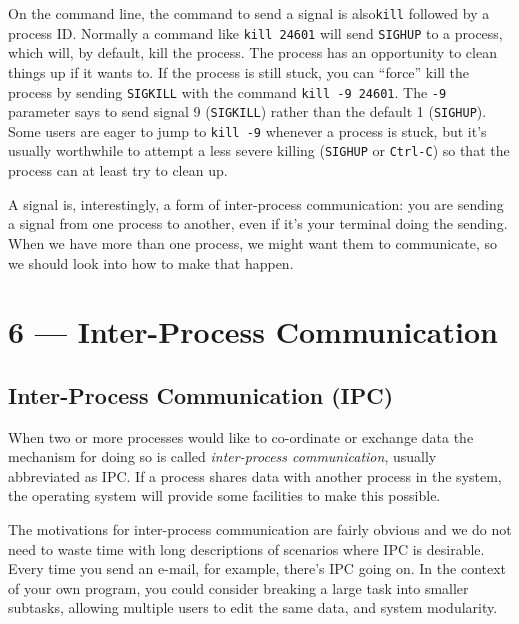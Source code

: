 \documentclass[a4paper]{report}
\begin{document}
On the command line, the command to send a signal is also\texttt{kill} followed by a process ID. Normally a command like \texttt{kill 24601} will send \texttt{SIGHUP} to a process, which will, by default, kill the process. The process has an opportunity to clean things up if it wants to. If the process is still stuck, you can ``force'' kill the process by sending \texttt{SIGKILL} with the command \texttt{kill -9 24601}. The \texttt{-9} parameter says to send signal 9 (\texttt{SIGKILL}) rather than the default 1 (\texttt{SIGHUP}). Some users are eager to jump to \texttt{kill -9} whenever a process is stuck, but it's usually worthwhile to attempt a less severe killing (\texttt{SIGHUP} or \texttt{Ctrl-C}) so that the process can at least try to clean up.


A signal is, interestingly, a form of inter-process communication: you are sending a signal from one process to another, even if it's your terminal doing the sending. When we have more than one process, we might want them to communicate, so we should look into how to make that happen.









\chapter*{6 --- Inter-Process Communication}


\section*{Inter-Process Communication (IPC)}
When two or more processes would like to co-ordinate or exchange data the mechanism for doing so is called \textit{inter-process communication}, usually abbreviated as IPC. If a process shares data with another process in the system, the operating system will provide some facilities to make this possible.

The motivations for inter-process communication are fairly obvious and we do not need to waste time with long descriptions of scenarios where IPC is desirable. Every time you send an e-mail, for example, there's IPC going on. In the context of your own program, you could consider breaking a large task into smaller subtasks, allowing multiple users to edit the same data, and system modularity.
\end{document}
